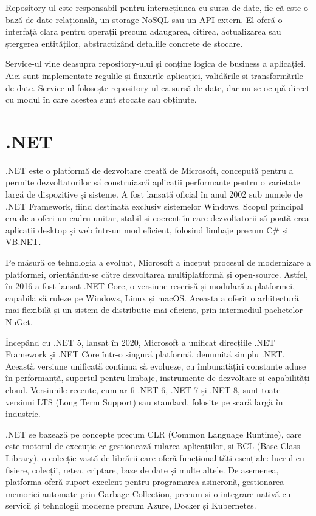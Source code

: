 Repository-ul este responsabil pentru interacțiunea cu sursa de date, fie că este o bază de date relațională, un storage NoSQL sau un API extern. El oferă o interfață clară pentru operații precum adăugarea, citirea, actualizarea sau ștergerea entităților, abstractizând detaliile concrete de stocare. \parencite{designPatterns}

Service-ul vine deasupra repository-ului și conține logica de business a aplicației. Aici sunt implementate regulile și fluxurile aplicației, validările și transformările de date. Service-ul folosește repository-ul ca sursă de date, dar nu se ocupă direct cu modul în care acestea sunt stocate sau obținute. \parencite{designPatterns}

\section{.NET}

.NET este o platformă de dezvoltare creată de Microsoft, concepută pentru a permite dezvoltatorilor să construiască aplicații performante pentru o varietate largă de dispozitive și sisteme. A fost lansată oficial în anul 2002 sub numele de .NET Framework, fiind destinată exclusiv sistemelor Windows. Scopul principal era de a oferi un cadru unitar, stabil și coerent în care dezvoltatorii să poată crea aplicații desktop și web într-un mod eficient, folosind limbaje precum C\# și VB.NET. \parencite{dotnet}

Pe măsură ce tehnologia a evoluat, Microsoft a început procesul de modernizare a platformei, orientându-se către dezvoltarea multiplatformă și open-source. Astfel, în 2016 a fost lansat .NET Core, o versiune rescrisă și modulară a platformei, capabilă să ruleze pe Windows, Linux și macOS. Aceasta a oferit o arhitectură mai flexibilă și un sistem de distribuție mai eficient, prin intermediul pachetelor NuGet. \parencite{dotnet}

Începând cu .NET 5, lansat în 2020, Microsoft a unificat direcțiile .NET Framework și .NET Core într-o singură platformă, denumită simplu .NET. Această versiune unificată continuă să evolueze, cu îmbunătățiri constante aduse în performanță, suportul pentru limbaje, instrumente de dezvoltare și capabilități cloud. Versiunile recente, cum ar fi .NET 6, .NET 7 și .NET 8, sunt toate versiuni LTS (Long Term Support) sau standard, folosite pe scară largă în industrie. \parencite{dotnet}

.NET se bazează pe concepte precum CLR (Common Language Runtime), care este motorul de execuție ce gestionează rularea aplicațiilor, și BCL (Base Class Library), o colecție vastă de librării care oferă funcționalități esențiale: lucrul cu fișiere, colecții, rețea, criptare, baze de date și multe altele. De asemenea, platforma oferă suport excelent pentru programarea asincronă, gestionarea memoriei automate prin Garbage Collection, precum și o integrare nativă cu servicii și tehnologii moderne precum Azure, Docker și Kubernetes. \parencite{dotnet}

